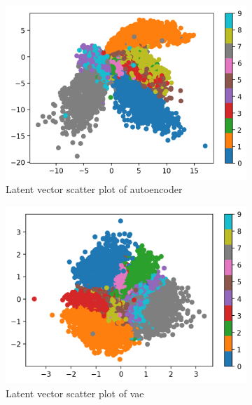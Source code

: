 \documentclass[11pt, a4paper]{article}
\begin{document}
	\begin{figure}[H]
		\centering
		\begin{subfigure}[b]{0.49\textwidth}
			\centering
			\includegraphics[width=\textwidth]{imgs/relatedwork/ae-latentvector}
			\caption{Latent vector scatter plot of autoencoder}
			\label{fig:y equals x}
		\end{subfigure}
		\hfill
		\begin{subfigure}[b]{0.49\textwidth}
			\centering
			\includegraphics[width=\textwidth]{imgs/relatedwork/vae-latentvector}
			\caption{Latent vector scatter plot of \gls{vae}}
			\label{fig:three sin x}
		\end{subfigure}
		\\
		\begin{subfigure}[b]{0.49\textwidth}

\end{subfigure}
\end{figure}
\end{document}
